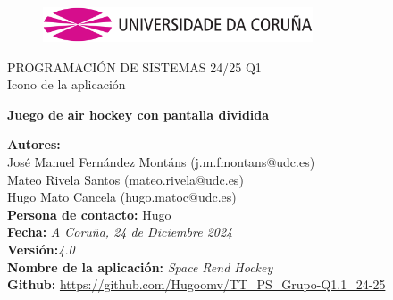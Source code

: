 \documentclass[a4paper,openright,12pt]{article}
\begin{document}
\begin{titlepage}

\begin{center}
\vspace*{-1in}
\begin{figure}[htb]
\begin{center}
\includegraphics[width=8cm]{udc.eps}
\end{center}
\end{figure}

\vspace*{1in}
PROGRAMACIÓN DE SISTEMAS 24/25 Q1\\
Icono de la aplicación\\
\vspace*{1in}
\begin{Large}
\textbf{Juego de air hockey con pantalla dividida} \\
\end{Large}

\vspace*{3in}

\begin{large}
\raggedleft
\textbf{Autores:}\\ José Manuel Fernández Montáns (j.m.fmontans@udc.es) \\
Mateo Rivela Santos (mateo.rivela@udc.es)\\
Hugo Mato Cancela (hugo.matoc@udc.es)\\
\textbf{Persona de contacto:} Hugo\\
\textbf{Fecha:}\textit{ A Coruña, 24 de Diciembre 2024}\\
\textbf{Versión:}\textit{4.0}\\
\textbf{Nombre de la aplicación:} \textit{Space Rend Hockey}\\
\textbf{Github:} \url{https://github.com/Hugoomv/TT_PS_Grupo-Q1.1_24-25}\\
\end{large}

\end{center}
\end{titlepage} 

\newpage

\end{document}
